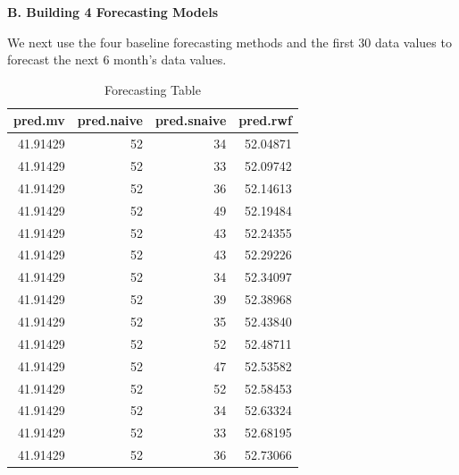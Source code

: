 \documentclass[
]{book}
\newenvironment{Shaded}{\begin{snugshade}}{\end{snugshade}}
\newcommand{\AttributeTok}[1]{\textcolor[rgb]{0.13,0.29,0.53}{#1}}
\newcommand{\ConstantTok}[1]{\textcolor[rgb]{0.56,0.35,0.01}{#1}}
\newcommand{\DecValTok}[1]{\textcolor[rgb]{0.00,0.00,0.81}{#1}}
\newcommand{\DocumentationTok}[1]{\textcolor[rgb]{0.56,0.35,0.01}{\textbf{\textit{#1}}}}
\newcommand{\FunctionTok}[1]{\textcolor[rgb]{0.13,0.29,0.53}{\textbf{#1}}}
\newcommand{\NormalTok}[1]{#1}
\newcommand{\OtherTok}[1]{\textcolor[rgb]{0.56,0.35,0.01}{#1}}
\newcommand{\SpecialCharTok}[1]{\textcolor[rgb]{0.81,0.36,0.00}{\textbf{#1}}}
\newcommand{\StringTok}[1]{\textcolor[rgb]{0.31,0.60,0.02}{#1}}
\begin{document}
\textbf{B. Building 4 Forecasting Models}

We next use the four baseline forecasting methods and the first 30 data values to forecast the next 6 month's data values.

\begin{Shaded}
\end{Shaded}

\begin{table}

\caption{\label{tab:unnamed-chunk-193}Forecasting Table}
\centering
\begin{tabular}[t]{r|r|r|r}
\hline
pred.mv & pred.naive & pred.snaive & pred.rwf\\
\hline
41.91429 & 52 & 34 & 52.04871\\
\hline
41.91429 & 52 & 33 & 52.09742\\
\hline
41.91429 & 52 & 36 & 52.14613\\
\hline
41.91429 & 52 & 49 & 52.19484\\
\hline
41.91429 & 52 & 43 & 52.24355\\
\hline
41.91429 & 52 & 43 & 52.29226\\
\hline
41.91429 & 52 & 34 & 52.34097\\
\hline
41.91429 & 52 & 39 & 52.38968\\
\hline
41.91429 & 52 & 35 & 52.43840\\
\hline
41.91429 & 52 & 52 & 52.48711\\
\hline
41.91429 & 52 & 47 & 52.53582\\
\hline
41.91429 & 52 & 52 & 52.58453\\
\hline
41.91429 & 52 & 34 & 52.63324\\
\hline
41.91429 & 52 & 33 & 52.68195\\
\hline
41.91429 & 52 & 36 & 52.73066\\
\hline
\end{tabular}
\end{table}
\end{document}
